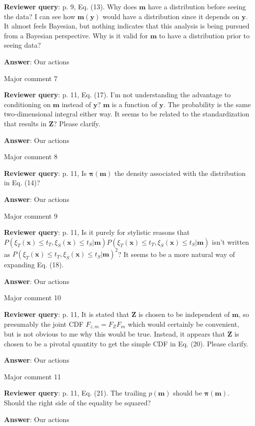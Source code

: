 \documentclass[a4paper]{article}
\newcommand{\bm}{ {\boldsymbol m} }
\newcommand{\bx}{ {\boldsymbol x} }
\newcommand{\by}{ {\boldsymbol y} }
\newcommand{\bZ}{ {\boldsymbol Z} }
\newcommand{\bpi}{ {\boldsymbol \pi} }
\def\reply{\textbf{Reviewer query}}
\def\action{\textbf{Answer}}
\begin{document}
\begin{answers}
\reply: p. 9, Eq. (13). Why does $\bm$ have a distribution before seeing the data? I can see how $\bm(\by)$ would have a distribution since it depends on $\by$. It almost feels Bayesian, but nothing indicates that this analysis is being pursued from a Bayesian perspective. Why is it valid for $\bm$ to have a distribution prior to seeing data?

\action: Our actions

\item{Major comment 7}\label{q18}

\reply: p. 11, Eq. (17). I’m not understanding the advantage to conditioning on $\bm$ instead of $\by$? $\bm$ is a function of $\by$. The probability is the same two-dimensional integral either way. It seems to be related to the standardization that results in $\bZ$? Please clarify.

\action: Our actions

\item{Major comment 8}\label{q19}

\reply: p. 11, Is $\bpi(\bm)$ the density associated with the distribution in Eq. (14)? 

\action: Our actions

\item{Major comment 9}\label{q20}

\reply: p. 11, Is it purely for stylistic reasons that $P(\xi_T(\bx) \leq t_T, \xi_S(\bx) \leq t_S |\bm)P(\xi_T(\bx) \leq t_T, \xi_S(\bx) \leq t_S |\bm)$ isn’t written as $P(\xi_T(\bx) \leq t_T, \xi_S(\bx) \leq t_S |\bm)^2$? It seems to be a more natural way of expanding Eq. (18). 

\action: Our actions

\item{Major comment 10}\label{q21}

\reply: p. 11, It is stated that $\bZ$ is chosen to be independent of $\bm$, so presumably the joint CDF $F_{z,m}=F_{Z}F_m$ which would certainly be convenient, but is not obvious to me why this would be true. 
Instead, it appears that $\bZ$ is chosen to be a pivotal quantity to get the simple CDF in Eq. (20). Please clarify.

\action: Our actions

\item{Major comment 11}\label{q22}

\reply: p. 11, Eq. (21). The trailing $p(\bm)$ should be $\bpi(\bm)$. Should the right side of the equality be squared? 

\action: Our actions


\end{answers}
\end{document}
